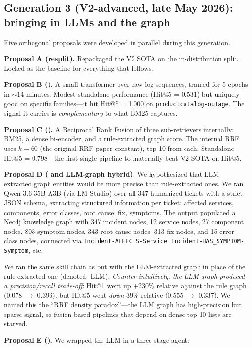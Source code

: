 \subsection{Generation 3 (V2-advanced, late May 2026): bringing in LLMs and the graph}

Five orthogonal proposals were developed in parallel during this generation.

\textbf{Proposal A (resplit).} Repackaged the V2 SOTA on the in-distribution split. Locked as the baseline for everything that follows.

\textbf{Proposal B (\logseq{}).} A small transformer over raw log sequences, trained for 5 epochs in $\sim$14 minutes. Modest standalone performance (Hit@5 = 0.531) but uniquely good on specific families---it hit Hit@5 = 1.000 on \texttt{productcatalog-outage}. The signal it carries is \emph{complementary} to what BM25 captures.

\textbf{Proposal C (\hrrf{}).} A Reciprocal Rank Fusion of three sub-retrievers internally: BM25, a dense bi-encoder, and a rule-extracted graph score. The internal RRF uses $k = 60$ (the original RRF paper constant), top-10 from each. Standalone Hit@5 = 0.798---the first single pipeline to materially beat V2 SOTA on Hit@5.

\textbf{Proposal D (\kgret{} and LLM-graph hybrid).} We hypothesized that LLM-extracted graph entities would be more precise than rule-extracted ones. We ran Qwen 3.6 35B-A3B (via LM Studio) over all 347 humanized tickets with a strict JSON schema, extracting structured information per ticket: affected services, components, error classes, root cause, fix, symptoms. The output populated a Neo4j knowledge graph with 347 incident nodes, 12 service nodes, 27 component nodes, 803 symptom nodes, 343 root-cause nodes, 313 fix nodes, and 15 error-class nodes, connected via \texttt{Incident-AFFECTS-Service}, \texttt{Incident-HAS\_SYMPTOM-Symptom}, etc.

We ran the same skill chain as \hrrf{} but with the LLM-extracted graph in place of the rule-extracted one (denoted \hrrf{}-LLM). \emph{Counter-intuitively, the LLM graph produced a precision/recall trade-off}: Hit@1 went up +230\% relative against the rule graph (0.078 $\to$ 0.396), but Hit@5 went \emph{down} 39\% relative (0.555 $\to$ 0.337). We named this the ``RRF density paradox''---the LLM graph has high-precision but sparse signal, so fusion-based pipelines that depend on dense top-10 lists are starved.

\textbf{Proposal E (\agent{}).} We wrapped the LLM in a three-stage agent:


